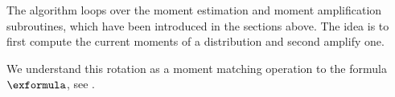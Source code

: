 The algorithm loops over the moment estimation and moment amplification subroutines, which have been introduced in the sections above.
The idea is to first compute the current moments of a distribution and second amplify one.




We understand this rotation as a moment matching operation to the formula $\exformula$, see .

